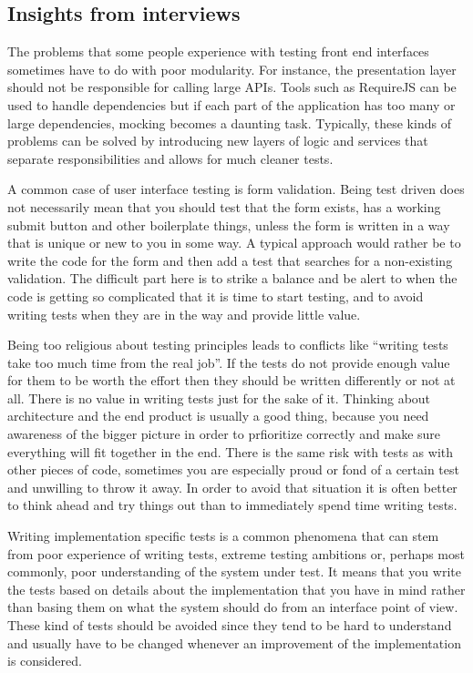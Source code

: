 \documentclass[11pt]{article}
\begin{document}
\subsection{Insights from interviews}


The problems that some people experience with testing front end interfaces sometimes have to do with poor modularity. For instance, the presentation layer should not be responsible for calling large APIs. Tools such as RequireJS can be used to handle dependencies but if each part of the application has too many or large dependencies, mocking becomes a daunting task. Typically, these kinds of problems can be solved by introducing new layers of logic and services that separate responsibilities and allows for much cleaner tests. \cite[question~23]{Edelstam}

A common case of user interface testing is form validation. Being test driven does not necessarily mean that you should test that the form exists, has a working submit button and other boilerplate things, unless the form is written in a way that is unique or new to you in some way. A typical approach would rather be to write the code for the form and then add a test that searches for a non-existing validation. The difficult part here is to strike a balance and be alert to when the code is getting so complicated that it is time to start testing, and to avoid writing tests when they are in the way and provide little value. \cite[questions~24-25]{Edelstam}

Being too religious about testing principles leads to conflicts like ``writing tests take too much time from the real job''. If the tests do not provide enough value for them to be worth the effort then they should be written differently or not at all. There is no value in writing tests just for the sake of it. Thinking about architecture and the end product is usually a good thing, because you need awareness of the bigger picture in order to prfioritize correctly and make sure everything will fit together in the end. There is the same risk with tests as with other pieces of code, sometimes you are especially proud or fond of a certain test and unwilling to throw it away. In order to avoid that situation it is often better to think ahead and try things out than to immediately spend time writing tests. \cite[question~27]{Edelstam}

Writing implementation specific tests is a common phenomena that can stem from poor experience of writing tests, extreme testing ambitions or, perhaps most commonly, poor understanding of the system under test. It means that you write the tests based on details about the implementation that you have in mind rather than basing them on what the system should do from an interface point of view. These kind of tests should be avoided since they tend to be hard to understand and usually have to be changed whenever an improvement of the implementation is considered.
\end{document}
